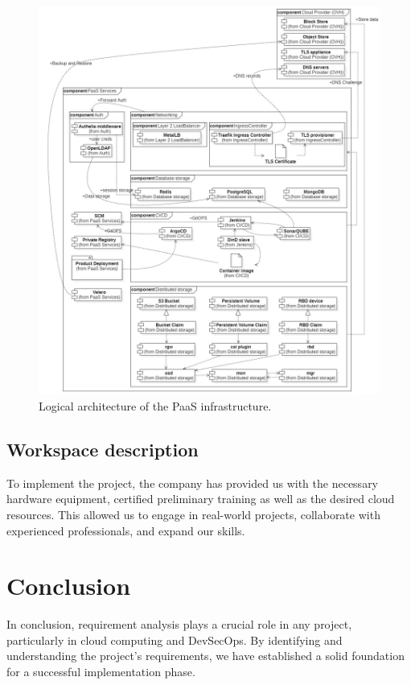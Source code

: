 \begin{figure}[H]\centering
\includegraphics[width=1.0\textwidth,angle=00]{assets/f8.jpg}
\caption{Logical architecture of the PaaS infrastructure.}
\label{fig:f8}
\end{figure}

\newpage

\subsection{Workspace description}

\hspace{7mm}To implement the project, the company has provided us with the necessary hardware equipment, certified preliminary training as well as the desired cloud resources. This allowed us to engage in real-world projects, collaborate with experienced professionals, and expand our skills.

\section*{Conclusion}
\hspace{7mm}In conclusion, requirement analysis plays a crucial role in any project, particularly in cloud computing and DevSecOps. By identifying and understanding the project's requirements, we have established a solid foundation for a successful implementation phase.

